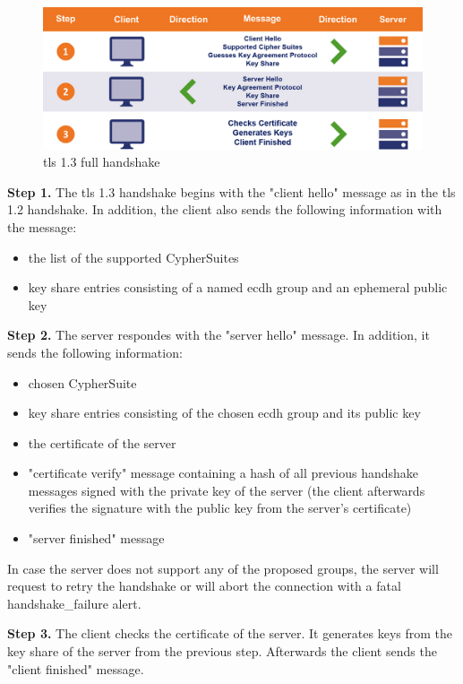 \begin{figure}[H]
	\centering
		\includegraphics[scale=0.35]{images/handshake1_3.jpg}
	\caption{\gls{tls} 1.3 full handshake \cite{sslstore:handshake}}
	\label{fig:handshake1_3}
\end{figure}

\textbf{Step 1.} The \gls{tls} 1.3 handshake begins with the "client hello" message as in the \gls{tls} 1.2 handshake. In addition, the client also sends the following information with the message:

\begin{itemize}
	\item the list of the supported CypherSuites
	\item key share entries consisting of a named \gls{ecdh} group and an ephemeral public key
\end{itemize}

\textbf{Step 2.} The server respondes with the "server hello" message. In addition, it sends the following information:

\begin{itemize}
	\item chosen CypherSuite
	\item key share entries consisting of the chosen \gls{ecdh} group and its public key
	\item the certificate of the server
	\item "certificate verify" message containing a hash of all previous handshake messages signed with the private key of the server (the client afterwards verifies the signature with the public key from the server's certificate)
	\item "server finished" message
\end{itemize}

In case the server does not support any of the proposed groups, the server will request to retry the handshake or will abort the connection with a fatal handshake\_failure alert.

\textbf{Step 3.} The client checks the certificate of the server. It generates keys from the key share of the server from the previous step. Afterwards the client sends the "client finished" message. \cite{Hassenstein}\cite{sslstore:handshake}

